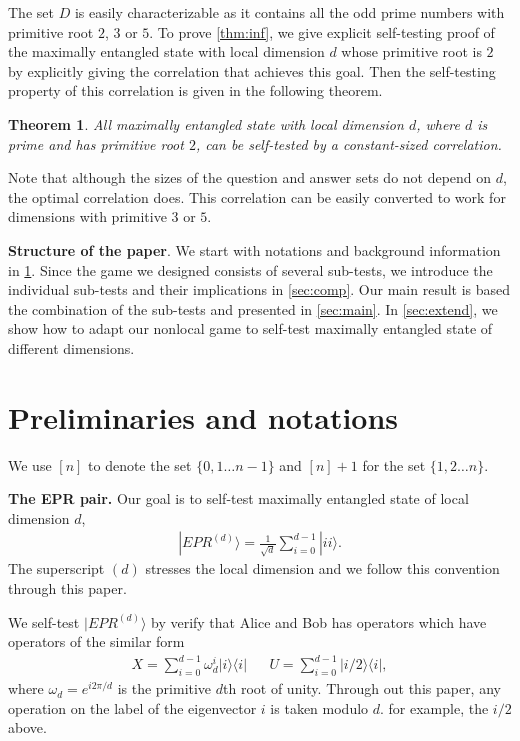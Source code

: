 \documentclass[11pt,letterpaper]{article}
\newcommand{\ket}[1]{|#1\rangle}
\newcommand{\ketbra}[2]{|#1\rangle\langle#2|}
\newcommand{\1}{\mathbb{1}}
\newcommand{\EPR}[1]{EPR^{(#1)}}
\newtheorem{theorem}{Theorem}
\theoremstyle{definition}
\begin{document}
The set $D$ is easily characterizable as it contains all the odd prime numbers with 
primitive root $2$, $3$ or $5$. To prove \cref{thm:inf}, we give explicit self-testing proof of 
the maximally entangled state with local dimension $d$ whose primitive root is $2$ by explicitly giving the 
correlation that achieves this goal. Then the self-testing property of this correlation is 
given in the following theorem.
\begin{theorem}
\label{thm:pr_2}
	All maximally entangled state with local dimension $d$, where $d$ is prime and has
	primitive root $2$, can be self-tested by a constant-sized correlation.
\end{theorem}
Note that although the sizes of the question and answer
sets do not depend on $d$, the optimal correlation does.
This correlation can be easily converted to work for dimensions with primitive $3$ or $5$.

\textbf{Structure of the paper}.
We start with notations and background information in \cref{sec:prelim}.
Since the game we designed consists of several sub-tests, we introduce the individual
sub-tests and their implications in \cref{sec:comp}. Our main result is based the combination
of the sub-tests and presented in \cref{sec:main}. In \cref{sec:extend}, we show how to adapt
our nonlocal game to self-test maximally entangled state of different dimensions.

\section{Preliminaries and notations}
\label{sec:prelim}
We use $[n]$ to denote the set $\{0,1 \dots n-1\}$ and $[n]+1$ for the set $\{1,2 \dots n\}$.

\textbf{The EPR pair.} Our goal is to self-test maximally entangled state of local dimension $d$, 
\begin{align}
\ket{\EPR{d}} = \frac{1}{\sqrt{d}} \sum_{i = 0}^{d-1} \ket{ii}.
\end{align}
The superscript $(d)$ stresses the local dimension and we follow this convention through this paper.

We self-test $\ket{\EPR{d}}$ by verify that Alice and Bob has operators 
which have operators of the similar form
\begin{align}
	X = \sum_{i=0}^{d-1} \omega_d^i\ketbra{i}{i} && U = \sum_{i=0}^{d-1} \ketbra{i/2}{i},
\end{align}
where $\omega_d = e^{i2\pi/d}$ is the primitive $d$th root of unity.
Through out this paper, any operation on the label of the eigenvector $i$ is taken modulo $d$.
for example, the $i/2$ above.
\end{document}
